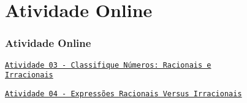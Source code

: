 
\section{Atividade Online}
\begin{frame}
\frametitle{Atividade Online} 

\href{https://pt.khanacademy.org/math/algebra/x2f8bb11595b61c86:irrational-numbers/x2f8bb11595b61c86:irrational-numbers-intro/e/recognizing-rational-and-irrational-numbers}
{{\tt Atividade 03 - Classifique Números: Racionais e \\ Irracionais}}

\href{https://pt.khanacademy.org/math/algebra/x2f8bb11595b61c86:irrational-numbers/x2f8bb11595b61c86:sums-and-products-of-rational-and-irrational-numbers/e/recognizing-rational-and-irrational-expressions}
{{\tt Atividade 04 - Expressões Racionais Versus Irracionais}}




\end{frame}

